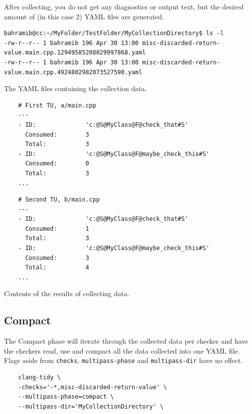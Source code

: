After collecting, you do not get any diagnostics or output text, but the desired amount of (in this case 2) YAML files are generated.

\begin{listing}[H]
	\begin{verbatim}
bahramib@cc:~/MyFolder/TestFolder/MyCollectionDirectory$ ls -l
-rw-r--r-- 1 bahramib 196 Apr 30 13:00 misc-discarded-return-value.main.cpp.12949585208029997868.yaml
-rw-r--r-- 1 bahramib 196 Apr 30 13:00 misc-discarded-return-value.main.cpp.4924802982073527590.yaml
	\end{verbatim}
	\caption{The YAML files containing the collection data.}
\end{listing}

\begin{listing}[H]
	\begin{verbatim}
	# First TU, a/main.cpp
	---
	- ID:              'c:@S@MyClass@F@check_that#S'
	  Consumed:        3
	  Total:           3
	- ID:              'c:@S@MyClass@F@maybe_check_this#S'
	  Consumed:        0
	  Total:           3
	...
	\end{verbatim}

	\begin{verbatim}
	# Second TU, b/main.cpp
	---
	- ID:              'c:@S@MyClass@F@check_that#S'
	  Consumed:        1
	  Total:           3
	- ID:              'c:@S@MyClass@F@maybe_check_this#S'
	  Consumed:        3
	  Total:           4
	...
	\end{verbatim}
	\caption{Contents of the results of collecting data.}
\end{listing}

\subsection{Compact}

The Compact phase will iterate through the collected data per checker and have the checkers read, use and compact all the data collected
into one YAML file. Flags aside from \texttt{checks}, \texttt{multipass-phase} and \texttt{multipass-dir} have no effect.

\begin{listing}[H]
	\begin{verbatim}
	clang-tidy \
	-checks='-*,misc-discarded-return-value' \
	--multipass-phase=compact \
	--multipass-dir='MyCollectionDirectory' \
	\end{verbatim}
\end{listing}

